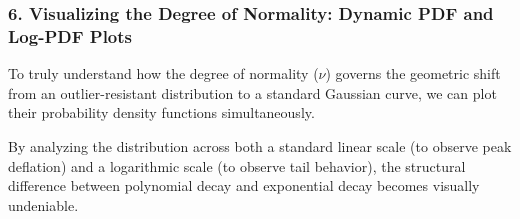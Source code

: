 \documentclass{article}
\begin{document}
\subsubsection*{6. Visualizing the Degree of Normality: Dynamic PDF and Log-PDF Plots}

To truly understand how the degree of normality ($\nu$) governs the geometric shift from an outlier-resistant distribution to a standard Gaussian curve, we can plot their probability density functions simultaneously. 

By analyzing the distribution across both a standard linear scale (to observe peak deflation) and a logarithmic scale (to observe tail behavior), the structural difference between polynomial decay and exponential decay becomes visually undeniable.

\begin{figure}[htbp]
    \centering
    \begin{minipage}{0.48\textwidth}
        \centering
\end{minipage}
\end{figure}
\end{document}

